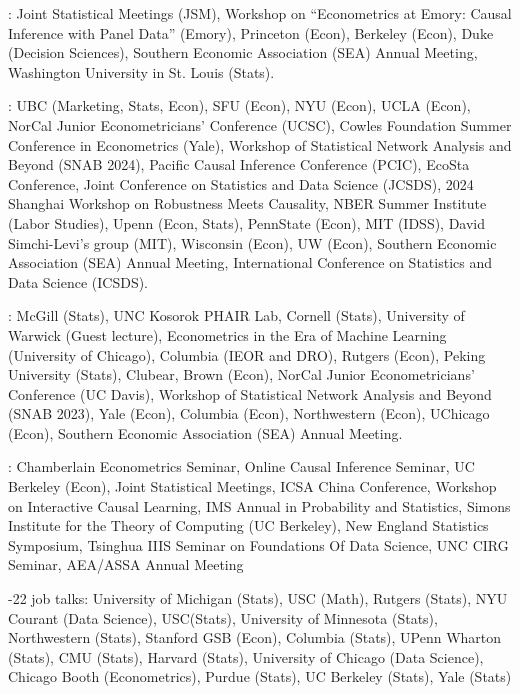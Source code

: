 \documentclass{article}
\begin{document}
\vspace{4mm}
: Joint Statistical Meetings (JSM), Workshop on ``Econometrics at Emory: Causal Inference with Panel Data'' (Emory), Princeton (Econ), Berkeley (Econ), Duke (Decision Sciences), Southern Economic Association (SEA) Annual Meeting, Washington University in St. Louis (Stats).

\vspace{4mm}
: UBC (Marketing, Stats, Econ), SFU (Econ), NYU (Econ), UCLA (Econ), NorCal Junior Econometricians' Conference (UCSC), Cowles Foundation Summer Conference in Econometrics (Yale), Workshop of Statistical Network Analysis and Beyond (SNAB 2024), Pacific Causal Inference Conference (PCIC), EcoSta Conference, Joint Conference on Statistics and Data Science (JCSDS), 2024 Shanghai Workshop on Robustness Meets Causality, NBER Summer Institute (Labor Studies), Upenn (Econ, Stats), PennState (Econ), MIT (IDSS), David Simchi-Levi's group (MIT), Wisconsin (Econ), UW (Econ), Southern Economic Association (SEA) Annual Meeting, International Conference on Statistics and Data Science (ICSDS).

\vspace{4mm}
: McGill (Stats), UNC Kosorok PHAIR Lab, Cornell (Stats), University of Warwick (Guest lecture), Econometrics in the Era of Machine Learning (University of Chicago), Columbia (IEOR and DRO), Rutgers (Econ), Peking University (Stats), Clubear, Brown (Econ), NorCal Junior Econometricians' Conference (UC Davis), Workshop of Statistical Network Analysis and Beyond (SNAB 2023), Yale (Econ), Columbia (Econ), Northwestern (Econ), UChicago (Econ), Southern Economic Association (SEA) Annual Meeting.

\vspace{4mm}
: Chamberlain Econometrics Seminar, Online Causal Inference Seminar, UC Berkeley (Econ), Joint Statistical Meetings, ICSA China Conference, Workshop on Interactive Causal Learning, IMS Annual in Probability and Statistics, Simons Institute for the Theory of Computing (UC Berkeley), New England Statistics Symposium, Tsinghua IIIS Seminar on Foundations Of Data Science, UNC CIRG Seminar, AEA/ASSA Annual Meeting

\vspace{4mm}
-22 job talks: University of Michigan (Stats), USC (Math), Rutgers (Stats), NYU Courant (Data Science), USC(Stats), University of Minnesota (Stats), Northwestern (Stats), Stanford GSB (Econ), Columbia (Stats), UPenn Wharton (Stats), CMU (Stats), Harvard (Stats), University of Chicago (Data Science), Chicago Booth (Econometrics), Purdue (Stats), UC Berkeley (Stats), Yale (Stats)
\end{document}
